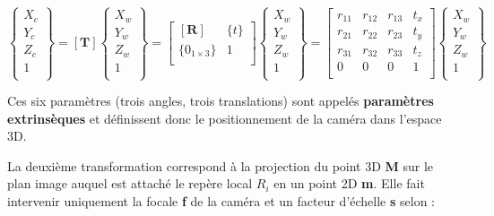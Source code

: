  
 \begin{equation}
 \left\{
 \begin{array}{c}
 	X_c \\
 	Y_c\\
    Z_c \\
 	 1 \\
 \end{array}
 \right\}
 =
 \left[ \textbf{T} \right] 
 \left\{
 \begin{array}{c}
 	 X_w \\
 	 Y_w \\
 	 Z_w \\
 	 1 \\
 \end{array}
 \right\}
 =
 \left[  
 \begin{array}{cc}
\left[ \textbf{R} \right] & \{t\} \\
\{0_{1 \times 3}\} & 1 \\	 
 \end{array}
  \right] 
\left\{
\begin{array}{c}
	X_w \\
	Y_w \\
	Z_w \\
	1 \\
\end{array}
\right\}
=
 \left[ 
 \begin{array}{cccc}
 	r_{11} & r_{12} & r_{13} & t_x \\
 	r_{21} & r_{22} & r_{23} & t_y \\
 	r_{31} & r_{32} & r_{33} & t_z\\
 	0 & 0 & 0 & 1 \\
 \end{array}
  \right]
 \left\{
 \begin{array}{c}
 	X_w \\
 	Y_w \\
 	Z_w \\
 	1 \\
 \end{array}
 \right\}
  \end{equation}
 
  
 Ces six paramètres (trois angles, trois translations) sont appelés \textbf{paramètres extrinsèques} et définissent donc le positionnement de la caméra dans l’espace 3D.
 
 La deuxième transformation correspond à la projection du point 3D \textbf{M} sur le plan image auquel est attaché le repère local \textbf{$R_i$} en un point 2D \textbf{m}. Elle fait intervenir uniquement la focale \textbf{f} de la caméra et un facteur d’échelle \textbf{s} selon : 
 
